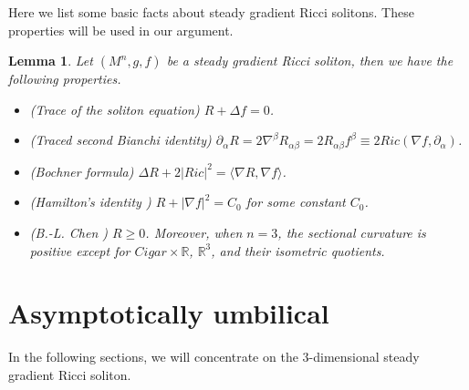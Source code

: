 \documentclass[12pt,a4paper]{amsart}
\newtheorem{Lma}{Lemma}
\begin{document}
Here we list some basic facts about steady gradient Ricci solitons. These properties will be used in our argument.
\begin{Lma}
Let $(M^n,g,f)$ be a steady gradient Ricci soliton, then we have the following properties.
\begin{itemize}
\item[\rm(a)] {\rm (Trace of the soliton equation)} $R+\Delta f=0$.
\item[\rm(b)] {\rm (Traced second Bianchi identity)}
$\partial_{\alpha}R=2\nabla^{\beta}R_{\alpha\beta}=2R_{\alpha\beta}f^{\beta}\equiv 2Ric(\nabla f, \partial_{\alpha})$.
\item[\rm(c)] {\rm (Bochner formula)} $\Delta R+2|Ric|^2=\langle\nabla R,\nabla f\rangle$.
\item[\rm(d)] {\rm (Hamilton's identity \cite[page 156]{ChowLuNi06})} $R+|\nabla f|^2=C_0$ for some constant $C_0$.
\item[\rm(e)] {\rm (B.-L. Chen \cite{Chen09})} $R\geq 0$. Moreover, when $n=3$, the sectional curvature is positive except for $Cigar\times\mathbb{R}$,
$\mathbb{R}^3$, and their isometric quotients.
\end{itemize}
\end{Lma}

\section{Asymptotically umbilical}
In the following sections, we will concentrate on the $3$-dimensional steady gradient Ricci soliton.
\end{document}

